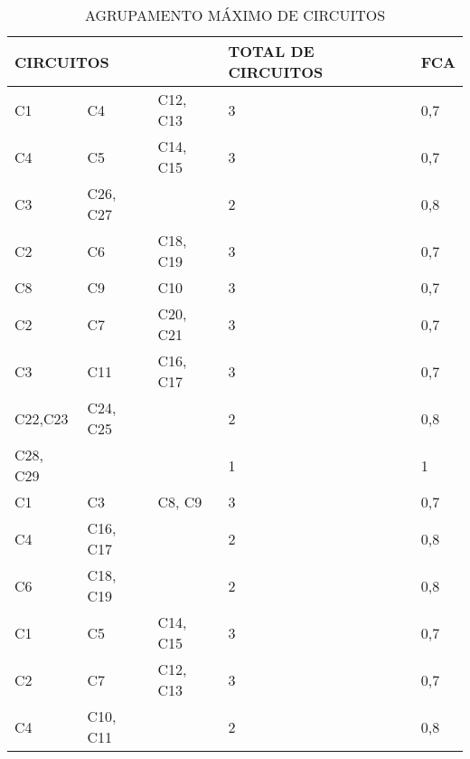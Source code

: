 \begin{longtable}{|lllll|}
	\caption{AGRUPAMENTO MÁXIMO DE CIRCUITOS}
	\label{tab:agrupamento_circuitos}\\
	\hline
	\endfirsthead
	\endhead
	\multicolumn{3}{|l|}{CIRCUITOS}                                                                & \multicolumn{1}{l|}{TOTAL DE CIRCUITOS} & FCA \\ \hline
	\multicolumn{1}{|l|}{C1}       & \multicolumn{1}{l|}{C4}       & \multicolumn{1}{l|}{C12, C13} & \multicolumn{1}{l|}{3}                  & 0,7 \\ \hline
	\multicolumn{1}{|l|}{C4}       & \multicolumn{1}{l|}{C5}       & \multicolumn{1}{l|}{C14, C15} & \multicolumn{1}{l|}{3}                  & 0,7 \\ \hline
	\multicolumn{1}{|l|}{C3}       & \multicolumn{1}{l|}{C26, C27} & \multicolumn{1}{l|}{}         & \multicolumn{1}{l|}{2}                  & 0,8 \\ \hline
	\multicolumn{1}{|l|}{C2}       & \multicolumn{1}{l|}{C6}       & \multicolumn{1}{l|}{C18, C19} & \multicolumn{1}{l|}{3}                  & 0,7 \\ \hline
	\multicolumn{1}{|l|}{C8}       & \multicolumn{1}{l|}{C9}       & \multicolumn{1}{l|}{C10}      & \multicolumn{1}{l|}{3}                  & 0,7 \\ \hline
	\multicolumn{1}{|l|}{C2}       & \multicolumn{1}{l|}{C7}       & \multicolumn{1}{l|}{C20, C21} & \multicolumn{1}{l|}{3}                  & 0,7 \\ \hline
	\multicolumn{1}{|l|}{C3}      & \multicolumn{1}{l|}{C11}      & \multicolumn{1}{l|}{C16, C17} & \multicolumn{1}{l|}{3} & 0,7 \\ \hline
	\multicolumn{1}{|l|}{C22,C23} & \multicolumn{1}{l|}{C24, C25} & \multicolumn{1}{l|}{}         & \multicolumn{1}{l|}{2} & 0,8 \\ \hline
	\multicolumn{1}{|l|}{C28, C29} & \multicolumn{1}{l|}{}         & \multicolumn{1}{l|}{}         & \multicolumn{1}{l|}{1}                  & 1   \\ \hline
	\multicolumn{1}{|l|}{C1}       & \multicolumn{1}{l|}{C3}       & \multicolumn{1}{l|}{C8, C9}   & \multicolumn{1}{l|}{3}                  & 0,7 \\ \hline
	\multicolumn{1}{|l|}{C4}       & \multicolumn{1}{l|}{C16, C17} & \multicolumn{1}{l|}{}         & \multicolumn{1}{l|}{2}                  & 0,8 \\ \hline
	\multicolumn{1}{|l|}{C6}       & \multicolumn{1}{l|}{C18, C19} & \multicolumn{1}{l|}{}         & \multicolumn{1}{l|}{2}                  & 0,8 \\ \hline
	\multicolumn{1}{|l|}{C1}       & \multicolumn{1}{l|}{C5}       & \multicolumn{1}{l|}{C14, C15} & \multicolumn{1}{l|}{3}                  & 0,7 \\ \hline
	\multicolumn{1}{|l|}{C2}       & \multicolumn{1}{l|}{C7}       & \multicolumn{1}{l|}{C12, C13} & \multicolumn{1}{l|}{3}                  & 0,7 \\ \hline
	\multicolumn{1}{|l|}{C4}       & \multicolumn{1}{l|}{C10, C11} & \multicolumn{1}{l|}{}         & \multicolumn{1}{l|}{2}                  & 0,8 \\ \hline
\end{longtable}

